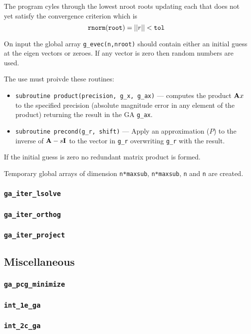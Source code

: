   The program cyles through the lowest nroot roots updating each that
does not yet satisfy the convergence criterion which is
\begin{displaymath}
   {\tt rnorm(root)} = ||r|| < {\tt tol}
\end{displaymath}

 On input the global array \verb+g_evec(n,nroot)+ should contain either an
initial guess at the eigen vectors or zeroes.  If any vector is zero
then random numbers are used.

The use must proivde these routines:
\begin{itemize}
\item \verb+subroutine product(precision, g_x, g_ax)+ ---
     computes the product ${\bf A}x$ to the specified precision (absolute
     magnitude error in any element of the product) returning the result
     in the GA \verb+g_ax+.
\item \verb+subroutine precond(g_r, shift)+ ---
     Apply an approximation ($P$) to the inverse of ${\bf A} - s {\bf
     I}$ to the vector in \verb+g_r+ overwriting \verb+g_r+ with the result.
\end{itemize}
     
If the initial guess is zero no redundant matrix product is formed.
    
Temporary global arrays of dimension \verb+n*maxsub+, \verb+n*maxsub+, 
\verb+n+ and \verb+n+ are created.


\subsubsection{{\tt ga\_iter\_lsolve}}

\subsubsection{{\tt ga\_iter\_orthog}}

\subsubsection{{\tt ga\_iter\_project}}

\subsection{Miscellaneous}

\subsubsection{{\tt ga\_pcg\_minimize}}

\subsubsection{{\tt int\_1e\_ga}}

\subsubsection{{\tt int\_2c\_ga}}


